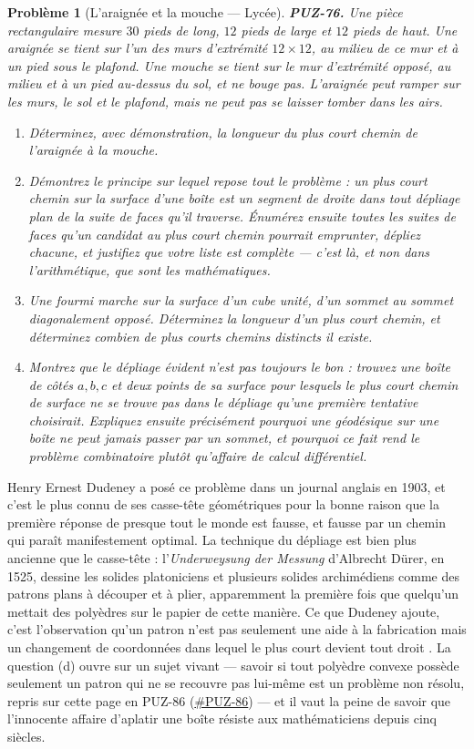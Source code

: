 \documentclass[11pt]{article}
\newtheorem{problem}{Problème}
\begin{document}
\begin{problem}[{L'araignée et la mouche --- Lycée}]
\textbf{PUZ-76.} Une pièce rectangulaire mesure $ 30 $ pieds de long, $ 12 $ pieds de
large et $ 12 $ pieds de haut. Une araignée se tient sur l'un des murs d'extrémité
$ 12 \times 12 $, au milieu de ce mur et à un pied sous le plafond. Une mouche se tient
sur le mur d'extrémité opposé, au milieu et à un pied au-dessus du sol, et ne bouge pas.
L'araignée peut ramper sur les murs, le sol et le plafond, mais ne peut pas se laisser
tomber dans les airs.
\begin{enumerate}
\item[(a)] Déterminez, avec démonstration, la longueur du plus court chemin de l'araignée à la
mouche.
\item[(b)] Démontrez le principe sur lequel repose tout le problème : un plus court chemin sur la
surface d'une boîte est un segment de droite dans tout dépliage plan de la suite de faces
qu'il traverse. Énumérez ensuite toutes les suites de faces qu'un candidat au plus court
chemin pourrait emprunter, dépliez chacune, et justifiez que votre liste est complète ---
c'est là, et non dans l'arithmétique, que sont les mathématiques.
\item[(c)] Une fourmi marche sur la surface d'un cube unité, d'un sommet au sommet diagonalement
opposé. Déterminez la longueur d'un plus court chemin, et déterminez combien de plus courts
chemins distincts il existe.
\item[(d)] Montrez que le dépliage évident n'est pas toujours le bon : trouvez une boîte de côtés
$ a, b, c $ et deux points de sa surface pour lesquels le plus court chemin de surface ne
se trouve \textit{pas} dans le dépliage qu'une première tentative choisirait. Expliquez
ensuite précisément pourquoi une géodésique sur une boîte ne peut jamais passer par un
sommet, et pourquoi ce fait rend le problème combinatoire plutôt qu'affaire de calcul
différentiel.
\end{enumerate}

\end{problem}

\noindent Henry Ernest Dudeney a posé ce problème dans un journal anglais en 1903,
et c'est le plus connu de ses casse-tête géométriques pour la bonne raison que la première
réponse de presque tout le monde est fausse, et fausse par un chemin qui paraît manifestement
optimal. La technique du dépliage est bien plus ancienne que le casse-tête :
l'\textit{Underweysung der Messung} d'Albrecht Dürer, en 1525, dessine les solides platoniciens
et plusieurs solides archimédiens comme des patrons plans à découper et à plier,
apparemment la première fois que quelqu'un mettait des polyèdres sur le papier de cette
manière. Ce que Dudeney ajoute, c'est l'observation qu'un patron n'est pas seulement une aide
à la fabrication mais un changement de coordonnées dans lequel \og{} le plus court \fg{} devient
\og{} tout droit \fg{}. La question (d) ouvre sur un sujet vivant --- savoir si tout polyèdre convexe
possède seulement un patron qui ne se recouvre pas lui-même est un problème non résolu,
repris sur cette page en PUZ-86 (\url{#PUZ-86}) --- et il vaut la peine de savoir que
l'innocente affaire d'aplatir une boîte résiste aux mathématiciens depuis cinq siècles.
\end{document}
